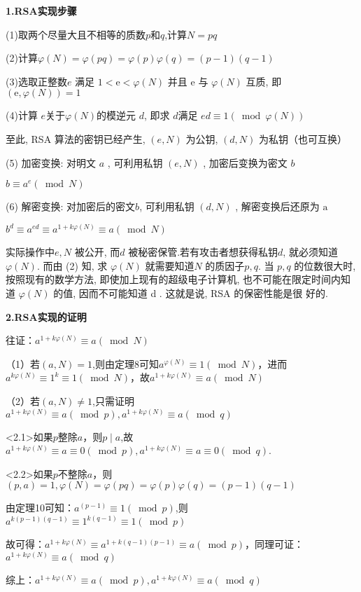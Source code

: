 \documentclass[a4paper,12pt]{article}
\newcommand{\upcite}[1]{\textsuperscript{\textsuperscript{\cite{#1}}}}
\begin{document}
\textbf{1.RSA实现步骤}\par

(1)取两个尽量大且不相等的质数$p$和$q$,计算$N=pq$\par
(2)计算$ \varphi\left(N\right)= \varphi\left(pq\right)=\varphi\left(p\right)\varphi\left(q\right)=(p-1)(q-1)$\par 
(3)选取正整数$ e$ 满足 $ 1<\mathrm{e}< \varphi\left(N\right)$  并且 $ \mathrm{e}$  与 $  \varphi\left(N\right)$  互质, 即 $ (\mathrm{e},  \varphi\left(N\right))=1 $\par 
(4)计算 $e$关于$  \varphi\left(N\right)  $的模逆元 $ d $, 即求 $ d  $满足 $ e d \equiv 1(\bmod \varphi\left(N\right))$\par 
至此, RSA 算法的密钥已经产生, $ (e, N) $ 为公钥, $ (d, N) $ 为私钥（也可互换）\par 
(5) 加密变换: 对明文 $ a$ , 可利用私钥  $(e,N)$ , 加密后变换为密文 $ b $\par 
\qquad $ b \equiv a^{e}(\bmod N) $\par 
(6) 解密变换: 对加密后的密文$b$, 可利用私钥 $ (d, N)$ , 解密变换后还原为  $\mathrm{a} $ \par 
\qquad $b^{d} \equiv a^{ed} \equiv a^{1+k \varphi\left(N\right)} \equiv a(\bmod N)$\par 
实际操作中$e,N$  被公开, 而$d$  被秘密保管.若有攻击者想获得私钥$d$,  就必须知道 $ \varphi(N) $. 而由 (2) 知, 求 $ \varphi(N)$  就需要知道$  N $ 的质因子$  p, q $. 当 $ p, q $ 的位数很大时,  按照现有的数学方法, 即使加上现有的超级电子计算机, 也不可能在限定时间内知道 $ \varphi(N) $ 的值, 因而不可能知道  d . 这就是说, RSA 的保密性能是很 好的. \upcite{初等数论} \par
\quad  \par 



\textbf{2.RSA实现的证明}\par

往证：$a^{1+k \varphi(N)} \equiv a(\bmod N)$\par 
（1）若$(a,N)=1$,则由定理8可知$ a^{\varphi(N)} \equiv 1(\bmod N)$，进而$ a^{k\varphi(N)} \equiv 1^k \equiv 1 (\bmod N)$，故$ a^{1+k\varphi(N)} \equiv a(\bmod N)$\par 
（2）若$(a,N)\not =1$,只需证明$a^{1+k \varphi(N)} \equiv a(\bmod p),a^{1+k \varphi(N)} \equiv a(\bmod q)$\par 
<2.1>如果$p$整除$a$，则$  p \mid a $,故$a^{1+k \varphi(N)} \equiv a \equiv 0 (\bmod p),a^{1+k \varphi(N)} \equiv a \equiv 0(\bmod q)$.\par 
<2.2>如果$p$不整除$a$，则$(p,a)=1, \varphi\left(N\right)= \varphi\left(pq\right)=\varphi\left(p\right)\varphi\left(q\right)=(p-1)(q-1)$\par
由定理10可知：$a^{(p-1)} \equiv 1(\bmod p) $,则$a^{k(p-1)(q-1)} \equiv 1^{k(q-1)} \equiv 1 (\bmod p) $\par 
故可得：$a^{1+k \varphi(N)} \equiv a^{1+k (q-1)(p-1)}  \equiv a (\bmod p)$，同理可证：$a^{1+k \varphi(N)} \equiv a(\bmod q)$\par 
综上：$a^{1+k \varphi(N)} \equiv a(\bmod p),a^{1+k \varphi(N)} \equiv a(\bmod q)$\par 
\end{document}

